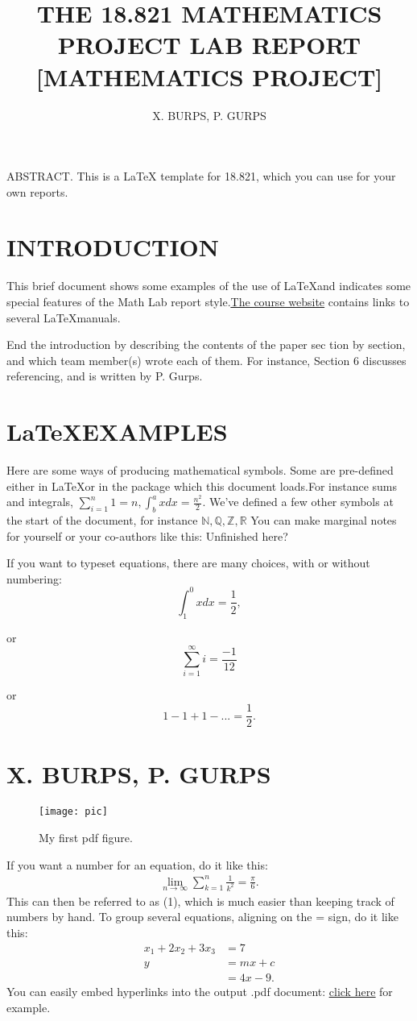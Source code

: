 \documentclass[leqno]{article}
\title{\textbf{THE 18.821 MATHEMATICS PROJECT LAB REPORT [MATHEMATICS PROJECT]}}
\author{X. BURPS, P. GURPS}
\date{}
\begin{document}
	\maketitle
	\fontsize{12pt}{14pt}
	ABSTRACT. This is a \LaTeX{} template for 18.821, which you can use for your own reports.
	\vspace{1.5 cm}
	\section{INTRODUCTION}
	\hspace{0.5 cm}
	This brief document shows some examples of the use of \LaTeX and
	indicates some special features of the Math Lab report style.\href{http://stellar.mit.edu/S/course/18/sp13/18.821/}{\underline{The course website}} contains links to several \LaTeX manuals.
	\par{}End the introduction by describing the contents of the paper sec­
	tion by section, and which team member(s) wrote each of them. For
	instance, Section 6 discusses referencing, and is written by P. Gurps.
	\section{\LaTeX EXAMPLES}
	\hspace{0.5 cm}
	Here are some ways of producing mathematical symbols. Some are pre-deﬁned either in \LaTeX or in the
	package which this document loads.For instance sums and integrals, $ \sum_{i=1}^{n} 1=n ,\int^a_b xdx =\frac{n^2}{2}.$ We’ve deﬁned a few other symbols at the start of the document, for
	instance $\mathbb{N,Q,Z,R}$ You can make marginal notes for yourself or your
	co-authors like this: \hspace{2 cm}	Unﬁnished here?\par{}
	If you want to typeset equations, there are many choices, with or
	without numbering:
	\[	\int^0_1 xdx= \frac{1}{2}, \]
	\raggedright 
	or  
	\[	\sum_{i=1}^{\infty}i=\frac{-1}{12} \]
	\raggedright
	or
	\[  1-1+1-...=\frac{1}{2}.\]
	\newpage
	\section*{X. BURPS, P. GURPS}
	\begin{figure}[h]
		\centering
		\texttt{[image: pic]}
		\caption{My ﬁrst pdf ﬁgure.}
		\label{fig:pic}
	\end{figure}
	If you want a number for an equation, do it like this:
	\begin{align}
		\lim_{n \to \infty} \sum_{k=1}^{n} \frac{1}{k^2}=\frac{\pi}{6}.
	\end{align}
	This can then be referred to as (1), which is much easier than keeping
	track of numbers by hand. To group several equations, aligning on the
	= sign, do it like this:
	\begin{align*}
		x_1 + 2x_2 + 3x_3 &= 7 \\
		y &= mx + c \\
		&= 4x - 9.
	\end{align*}
	You can easily embed hyperlinks into the output .pdf document:
	\href{http://stellar.mit.edu/S/course/18/sp13/18.821/}{\underline{click here}} for example.
\end{document}
